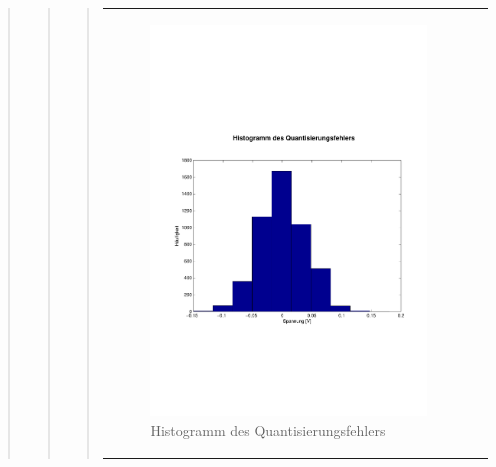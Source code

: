 \begin{quote}
\begin{quote}
\begin{quote}
\begin{center}
\begin{tabular}{ll}
                    \begin{minipage}{0.6\textwidth}
                        \begin{figure}[H]
                            \includegraphics[scale=0.4, trim = 0cm 7cm 0cm
                            7.5cm, clip]
                            {./Bilder/drei100_Histogramm}
                              \caption{Histogramm des Quantisierungsfehlers}
                        \end{figure}
                    \end{minipage}
                
                \end{tabular}
            \end{center}
            \vspace{1em}
            

\end{quote}
\end{quote}
\end{quote}
